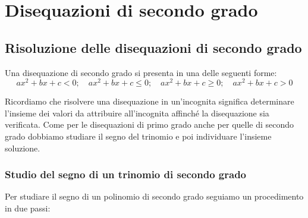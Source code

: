 


\chapter{Disequazioni di secondo grado}


\section{Risoluzione delle disequazioni di secondo grado}
\label{sec:diseq_secondo_grado}

Una disequazione di secondo grado si presenta in una delle seguenti forme:
\[ax^2+bx+c < 0;\quad ax^2+bx+c \leqslant 0;
  \quad ax^2+bx+c\geqslant0; \quad ax^2+bx+c > 0\]

Ricordiamo che risolvere una disequazione in un'incognita significa 
determinare l'insieme dei valori da attribuire all'incognita affinché la 
disequazione sia verificata.
Come per le disequazioni di primo grado anche per quelle di secondo grado
dobbiamo studiare il segno del trinomio e poi individuare l'insieme soluzione.

\subsection{Studio del segno di un trinomio di secondo grado}
\label{subsec:diseq_trinomio}

Per studiare il segno di un polinomio di secondo grado seguiamo un 
procedimento in due passi:

